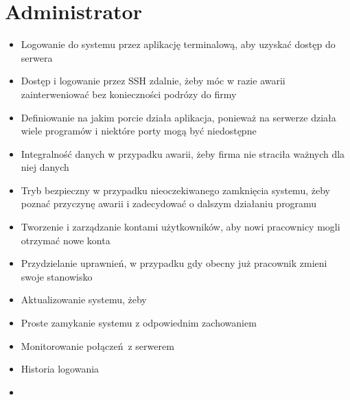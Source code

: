 \documentclass{article}
\begin{document}
\newpage
\section{Administrator}
\begin{itemize}
    \item Logowanie do systemu przez aplikację terminalową, aby uzyskać dostęp do serwera
    \item Dostęp i logowanie przez SSH zdalnie, żeby móc w razie awarii zainterweniować bez konieczności podrózy do firmy
    \item Definiowanie na jakim porcie działa aplikacja, ponieważ na serwerze działa wiele programów i niektóre porty mogą być niedostępne
    \item Integralność danych w przypadku awarii, żeby firma nie straciła ważnych dla niej danych
    \item Tryb bezpieczny w przypadku nieoczekiwanego zamknięcia systemu, żeby poznać przyczynę awarii i zadecydować o dalszym działaniu programu
    \item Tworzenie i zarządzanie kontami użytkowników, aby nowi pracownicy mogli otrzymać nowe konta
    \item Przydzielanie uprawnień, w przypadku gdy obecny już pracownik zmieni swoje stanowisko
    \item Aktualizowanie systemu, żeby 
    \item Proste zamykanie systemu z odpowiednim zachowaniem
    \item Monitorowanie połączeń z serwerem
    \item Historia logowania
    \item 
\end{itemize}
\end{document}
